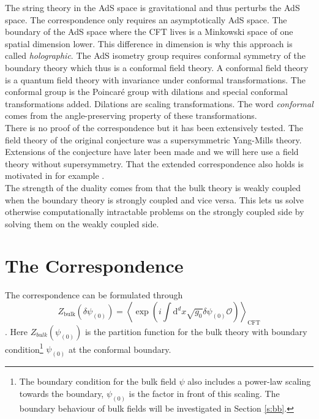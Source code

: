 \documentclass[12pt]{report}
\renewcommand{\d}{\ensuremath{\mathrm{d}}}
\renewcommand{\i}{\ensuremath{i}}
\begin{document}
The string theory in the AdS space is gravitational and thus perturbs the AdS space. The correspondence only requires an asymptotically AdS space. The boundary of the AdS space where the CFT lives is a Minkowski space of one spatial dimension lower. This difference in dimension is why this approach is called \emph{holographic}. The AdS isometry group requires conformal symmetry of the boundary theory which thus is a conformal field theory.
A conformal field theory is a quantum field theory with invariance under conformal transformations. The conformal group is the Poincar\'{e} group with dilations and special conformal transformations added. Dilations are scaling transformations. The word \emph{conformal} comes from the angle-preserving property of these transformations.\\

There is no proof of the correspondence but it has been extensively tested. The field theory of the original conjecture \cite{Maldacena:1997re} was a supersymmetric Yang-Mills theory. Extensions of the conjecture have later been made and we will here use a field theory without supersymmetry. That the extended correspondence also holds is motivated in for example \cite{McGreevy:2009xe}.\\

The strength of the duality comes from that the bulk theory is weakly coupled when the boundary theory is strongly coupled and vice versa. This lets us solve otherwise computationally intractable problems on the strongly coupled side by solving them on the weakly coupled side.\\


\section{The Correspondence\label{correspondence}}
The correspondence can be formulated through
\begin{equation}
 Z_{\mathrm{bulk}}(\delta\psi_{(0)})=\left\langle\exp(\i\int\d^dx\sqrt{g_0}\delta\psi_{(0)}\mathcal{O})\right\rangle_{\mathrm{CFT}}\label{fulCorr}
\end{equation}
 \cite{hartnoll8}. Here $Z_{bulk}(\psi_{(0)})$ is the partition function for the bulk theory with boundary condition\footnote{The boundary condition for the bulk field $\psi$ also includes a power-law scaling towards the boundary, $\psi_{(0)}$ is the factor in front of this scaling. The boundary behaviour of bulk fields will be investigated in Section \ref{s:bb}.} $\psi_{(0)}$ at the conformal boundary.\\
\end{document}
